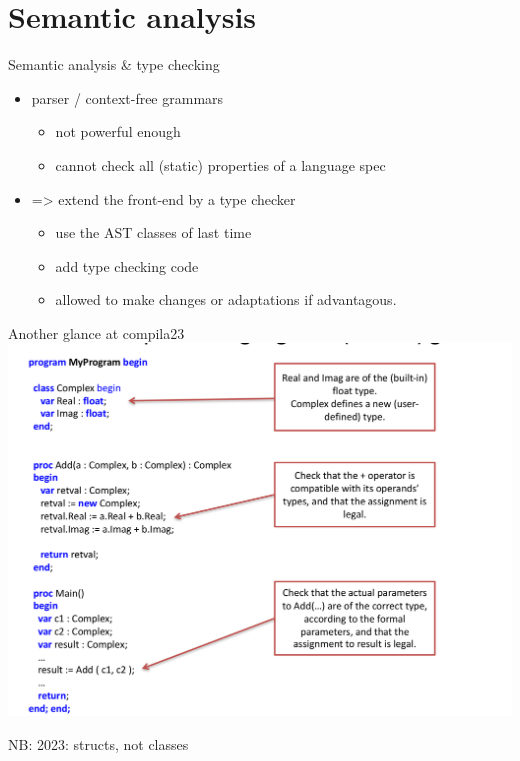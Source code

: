 \documentclass{beamer}
\begin{document}
\section{Semantic analysis}
\label{sec:org3396d9f}
\begin{frame}[label={sec:org0cb358e}]{Semantic analysis \& type checking}
\begin{itemize}
\item parser / context-free  grammars 
\begin{itemize}
\item not powerful enough
\item cannot check all (static) properties of a language spec
\end{itemize}

\item => extend the front-end by a type checker

\begin{itemize}
\item use the AST classes of last time
\item add type checking code
\item allowed to make \alert{changes} or adaptations if advantagous.
\end{itemize}
\end{itemize}
\end{frame}


\begin{frame}[label={sec:orgeb49238}]{Another glance at compila23}
\includegraphics[width=\textwidth]{figures/snaps/compilaexample-checking}


NB: 2023: structs, not classes 
\end{frame}
\end{document}
